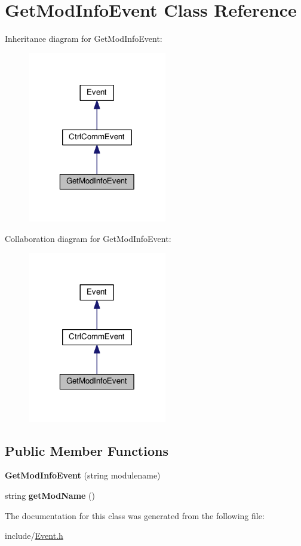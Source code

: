 \hypertarget{classGetModInfoEvent}{}\section{Get\+Mod\+Info\+Event Class Reference}
\label{classGetModInfoEvent}


Inheritance diagram for Get\+Mod\+Info\+Event\+:
\nopagebreak
\begin{figure}[H]
\begin{center}
\leavevmode
\includegraphics[width=172pt]{classGetModInfoEvent__inherit__graph}
\end{center}
\end{figure}


Collaboration diagram for Get\+Mod\+Info\+Event\+:
\nopagebreak
\begin{figure}[H]
\begin{center}
\leavevmode
\includegraphics[width=172pt]{classGetModInfoEvent__coll__graph}
\end{center}
\end{figure}
\subsection*{Public Member Functions}
\begin{DoxyCompactItemize}
\item 
\mbox{\label{classGetModInfoEvent_a39bb2be93dba7c6eb3edc2b5c09e536b}} 
{\bfseries Get\+Mod\+Info\+Event} (string modulename)
\item 
\mbox{\label{classGetModInfoEvent_adb5ca4ffac0dbb5f71f01a98a796858e}} 
string {\bfseries get\+Mod\+Name} ()
\end{DoxyCompactItemize}


The documentation for this class was generated from the following file\+:\begin{DoxyCompactItemize}
\item 
include/\hyperlink{Event_8h}{Event.\+h}\end{DoxyCompactItemize}
